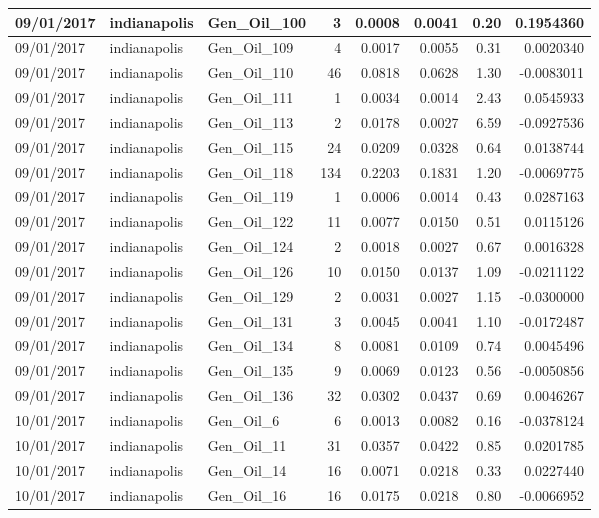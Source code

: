 \documentclass[
  letterpaper,
  DIV=11,
  numbers=noendperiod]{scrartcl}
\begin{document}
\begin{tabular}{l|l|l|r|r|r|r|r}
\hline
09/01/2017 & indianapolis & Gen\_Oil\_100 & 3 & 0.0008 & 0.0041 & 0.20 & 0.1954360\\
\hline
09/01/2017 & indianapolis & Gen\_Oil\_109 & 4 & 0.0017 & 0.0055 & 0.31 & 0.0020340\\
\hline
09/01/2017 & indianapolis & Gen\_Oil\_110 & 46 & 0.0818 & 0.0628 & 1.30 & -0.0083011\\
\hline
09/01/2017 & indianapolis & Gen\_Oil\_111 & 1 & 0.0034 & 0.0014 & 2.43 & 0.0545933\\
\hline
09/01/2017 & indianapolis & Gen\_Oil\_113 & 2 & 0.0178 & 0.0027 & 6.59 & -0.0927536\\
\hline
09/01/2017 & indianapolis & Gen\_Oil\_115 & 24 & 0.0209 & 0.0328 & 0.64 & 0.0138744\\
\hline
09/01/2017 & indianapolis & Gen\_Oil\_118 & 134 & 0.2203 & 0.1831 & 1.20 & -0.0069775\\
\hline
09/01/2017 & indianapolis & Gen\_Oil\_119 & 1 & 0.0006 & 0.0014 & 0.43 & 0.0287163\\
\hline
09/01/2017 & indianapolis & Gen\_Oil\_122 & 11 & 0.0077 & 0.0150 & 0.51 & 0.0115126\\
\hline
09/01/2017 & indianapolis & Gen\_Oil\_124 & 2 & 0.0018 & 0.0027 & 0.67 & 0.0016328\\
\hline
09/01/2017 & indianapolis & Gen\_Oil\_126 & 10 & 0.0150 & 0.0137 & 1.09 & -0.0211122\\
\hline
09/01/2017 & indianapolis & Gen\_Oil\_129 & 2 & 0.0031 & 0.0027 & 1.15 & -0.0300000\\
\hline
09/01/2017 & indianapolis & Gen\_Oil\_131 & 3 & 0.0045 & 0.0041 & 1.10 & -0.0172487\\
\hline
09/01/2017 & indianapolis & Gen\_Oil\_134 & 8 & 0.0081 & 0.0109 & 0.74 & 0.0045496\\
\hline
09/01/2017 & indianapolis & Gen\_Oil\_135 & 9 & 0.0069 & 0.0123 & 0.56 & -0.0050856\\
\hline
09/01/2017 & indianapolis & Gen\_Oil\_136 & 32 & 0.0302 & 0.0437 & 0.69 & 0.0046267\\
\hline
10/01/2017 & indianapolis & Gen\_Oil\_6 & 6 & 0.0013 & 0.0082 & 0.16 & -0.0378124\\
\hline
10/01/2017 & indianapolis & Gen\_Oil\_11 & 31 & 0.0357 & 0.0422 & 0.85 & 0.0201785\\
\hline
10/01/2017 & indianapolis & Gen\_Oil\_14 & 16 & 0.0071 & 0.0218 & 0.33 & 0.0227440\\
\hline
10/01/2017 & indianapolis & Gen\_Oil\_16 & 16 & 0.0175 & 0.0218 & 0.80 & -0.0066952\\

\end{tabular}
\end{document}
